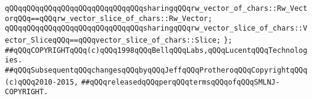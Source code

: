 \verb|qQQqqQQqqQQqqQQqqQQqqQQqqQQqqQQqsharingqQQqrw_vector_of_chars::Rw_VectorqQQq==qQQqrw_vector_slice_of_chars::Rw_Vector;|\newline
\verb|qQQqqQQqqQQqqQQqqQQqqQQqqQQqqQQqsharingqQQqrw_vector_slice_of_chars::Vector_SliceqQQq==qQQqvector_slice_of_chars::Slice;|\newline
\verb|};|\newline
\newline
\newline
\newline
\verb|##qQQqCOPYRIGHTqQQq(c)qQQq1998qQQqBellqQQqLabs,qQQqLucentqQQqTechnologies.|\newline
\verb|##qQQqSubsequentqQQqchangesqQQqbyqQQqJeffqQQqProtheroqQQqCopyrightqQQq(c)qQQq2010-2015,|\newline
\verb|##qQQqreleasedqQQqperqQQqtermsqQQqofqQQqSMLNJ-COPYRIGHT.|\newline

